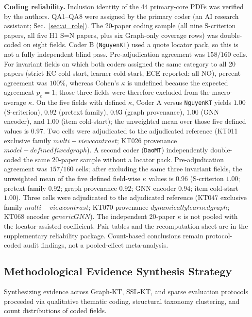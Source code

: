 \documentclass[lettersize,journal]{IEEEtran}
\begin{document}
\textbf{Coding reliability.} Inclusion identity of the 44 primary-core PDFs was verified by the authors. QA1--QA8 were assigned by the primary coder (an AI research assistant; Sec.~\ref{sec:ai_role}). The 20-paper coding sample (all nine S-criterion papers, all five H1 S=N papers, plus six Graph-only coverage rows) was double-coded on eight fields. Coder B (\texttt{NguyenKT}) used a quote locator pack, so this is not a fully independent blind pass. Pre-adjudication agreement was $158/160$ cells. For invariant fields on which both coders assigned the same category to all 20 papers (strict KC cold-start, learner cold-start, ECE reported: all NO), percent agreement was $100\%$, whereas Cohen's $\kappa$ is undefined because the expected agreement $p_e=1$; those three fields were therefore excluded from the macro-average $\kappa$. On the five fields with defined $\kappa$, Coder A versus \texttt{NguyenKT} yields $1.00$ (S-criterion), $0.92$ (pretext family), $0.93$ (graph provenance), $1.00$ (GNN encoder), and $1.00$ (item cold-start); the unweighted mean over those five defined values is $0.97$. Two cells were adjudicated to the adjudicated reference (KT011 exclusive family $multi-view contrast$; KT026 provenance $model-defined fixed graph$). A second coder (\texttt{DaoMT}) independently double-coded the same 20-paper sample without a locator pack. Pre-adjudication agreement was $157/160$ cells; after excluding the same three invariant fields, the unweighted mean of the five defined field-wise $\kappa$ values is $0.96$ (S-criterion $1.00$; pretext family $0.92$; graph provenance $0.92$; GNN encoder $0.94$; item cold-start $1.00$). Three cells were adjudicated to the adjudicated reference (KT047 exclusive family $multi-view contrast$; KT070 provenance $dynamically learned graph$; KT068 encoder $generic GNN$). The independent 20-paper $\kappa$ is not pooled with the locator-assisted coefficient. Pair tables and the recomputation sheet are in the supplementary reliability package. Count-based conclusions remain protocol-coded audit findings, not a pooled-effect meta-analysis.

\subsection{Methodological Evidence Synthesis Strategy}
Synthesizing evidence across Graph-KT, SSL-KT, and sparse evaluation protocols proceeded via qualitative thematic coding, structural taxonomy clustering, and count distributions of coded fields.
\end{document}
